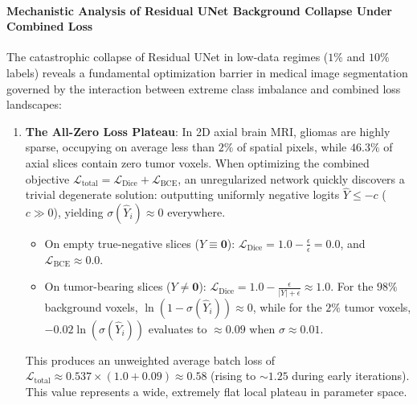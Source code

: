 \documentclass{article}
\begin{document}
\paragraph{Mechanistic Analysis of Residual UNet Background Collapse Under Combined Loss}
The catastrophic collapse of Residual UNet in low-data regimes ($1\%$ and $10\%$ labels) reveals a fundamental optimization barrier in medical image segmentation governed by the interaction between extreme class imbalance and combined loss landscapes:
\begin{enumerate}
    \item \textbf{The All-Zero Loss Plateau}: In 2D axial brain MRI, gliomas are highly sparse, occupying on average less than $2\%$ of spatial pixels, while $46.3\%$ of axial slices contain zero tumor voxels. When optimizing the combined objective $\mathcal{L}_{\text{total}} = \mathcal{L}_{\text{Dice}} + \mathcal{L}_{\text{BCE}}$, an unregularized network quickly discovers a trivial degenerate solution: outputting uniformly negative logits $\hat{Y} \le -c$ ($c \gg 0$), yielding $\sigma(\hat{Y}_i) \approx 0$ everywhere.
    \begin{itemize}
        \item On empty true-negative slices ($Y \equiv \mathbf{0}$): $\mathcal{L}_{\text{Dice}} = 1.0 - \frac{\epsilon}{\epsilon} = 0.0$, and $\mathcal{L}_{\text{BCE}} \approx 0.0$.
        \item On tumor-bearing slices ($Y \neq \mathbf{0}$): $\mathcal{L}_{\text{Dice}} = 1.0 - \frac{\epsilon}{|Y| + \epsilon} \approx 1.0$. For the $98\%$ background voxels, $\ln(1 - \sigma(\hat{Y}_i)) \approx 0$, while for the $2\%$ tumor voxels, $-0.02 \ln(\sigma(\hat{Y}_i))$ evaluates to $\approx 0.09$ when $\sigma \approx 0.01$.
    \end{itemize}
    This produces an unweighted average batch loss of $\mathcal{L}_{\text{total}} \approx 0.537 \times (1.0 + 0.09) \approx 0.58$ (rising to $\sim 1.25$ during early iterations). This value represents a wide, extremely flat local plateau in parameter space.
    

\end{enumerate}
\end{document}
